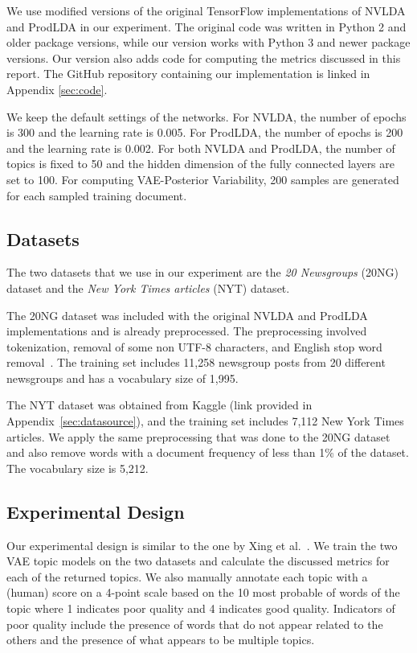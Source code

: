 \documentclass[10pt]{article}
\begin{document}
We use modified versions of the original TensorFlow implementations of NVLDA and ProdLDA in our experiment. The original code was written in Python 2 and older package versions, while our version works with Python 3 and newer package versions. Our version also adds code for computing the metrics discussed in this report. The GitHub repository containing our implementation is linked in Appendix \ref{sec:code}.

We keep the default settings of the networks. For NVLDA, the number of epochs is 300 and the learning rate is 0.005. For ProdLDA, the number of epochs is 200 and the learning rate is 0.002. For both NVLDA and ProdLDA, the number of topics is fixed to 50 and the hidden dimension of the fully connected layers are set to 100. For computing VAE-Posterior Variability, 200 samples are generated for each sampled training document.

\subsection{Datasets}

The two datasets that we use in our experiment are the \textit{20 Newsgroups} (20NG) dataset and the \textit{New York Times articles} (NYT) dataset.

The 20NG dataset was included with the original NVLDA and ProdLDA implementations and is already preprocessed. The preprocessing involved tokenization, removal of some non UTF-8 characters, and English stop word removal~\cite{Srivastava:2017}. The training set includes 11,258 newsgroup posts from 20 different newsgroups and has a vocabulary size of 1,995. 

The NYT dataset was obtained from Kaggle (link provided in Appendix~\ref{sec:datasource}), and the training set includes 7,112 New York Times articles. We apply the same preprocessing that was done to the 20NG dataset and also remove words with a document frequency of less than 1\% of the dataset. The vocabulary size is 5,212.

\subsection{Experimental Design}

Our experimental design is similar to the one by Xing et al.~. We train the two VAE topic models on the two datasets and calculate the discussed metrics for each of the returned topics. We also manually annotate each topic with a (human) score on a 4-point scale based on the 10 most probable of words of the topic where 1 indicates poor quality and 4 indicates good quality. Indicators of poor quality include the presence of words that do not appear related to the others and the presence of what appears to be multiple topics.
\end{document}
